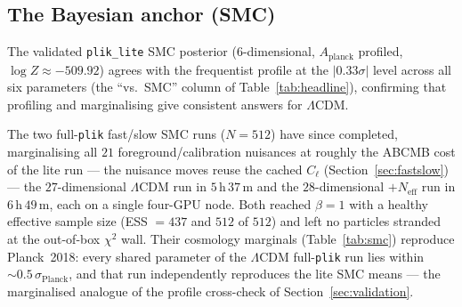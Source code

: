 \documentclass[11pt]{article}
\newcommand{\code}[1]{\texttt{\small #1}}
\newcommand{\Neff}{N_{\mathrm{eff}}}
\newcommand{\chisq}{\chi^2}
\begin{document}
\subsection{The Bayesian anchor (SMC)}

The validated \code{plik\_lite} SMC posterior ($6$-dimensional,
$A_{\mathrm{planck}}$ profiled, $\log Z\approx-509.92$) agrees with the
frequentist profile at the $|0.33\sigma|$ level across all six parameters
(the ``vs.\ SMC'' column of Table~\ref{tab:headline}), confirming that
profiling and marginalising give consistent answers for $\Lambda$CDM.

The two full-\code{plik} fast/slow SMC runs ($N=512$) have since completed,
marginalising all $21$ foreground/calibration nuisances at roughly the
\textsc{ABCMB} cost of the lite run --- the nuisance moves reuse the cached
$C_\ell$ (Section~\ref{sec:fastslow}) --- the $27$-dimensional $\Lambda$CDM run
in $5\,\mathrm{h}\,37\,\mathrm{m}$ and the $28$-dimensional $+\Neff$ run in
$6\,\mathrm{h}\,49\,\mathrm{m}$, each on a single four-GPU node. Both reached
$\beta=1$ with a healthy effective sample size (ESS $=437$ and $512$ of $512$)
and left no particles stranded at the out-of-box $\chisq$ wall. Their cosmology
marginals (Table~\ref{tab:smc}) reproduce Planck~2018: every shared parameter of
the $\Lambda$CDM full-\code{plik} run lies within
$\sim0.5\,\sigma_{\mathrm{Planck}}$, and that run independently reproduces the
lite SMC means --- the marginalised analogue of the profile cross-check of
Section~\ref{sec:validation}.
\end{document}
